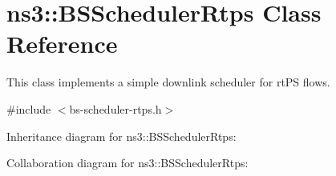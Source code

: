 \hypertarget{classns3_1_1BSSchedulerRtps}{}\section{ns3\+:\+:B\+S\+Scheduler\+Rtps Class Reference}
\label{classns3_1_1BSSchedulerRtps}


This class implements a simple downlink scheduler for rt\+PS flows.  




{\ttfamily \#include $<$bs-\/scheduler-\/rtps.\+h$>$}



Inheritance diagram for ns3\+:\+:B\+S\+Scheduler\+Rtps\+:


Collaboration diagram for ns3\+:\+:B\+S\+Scheduler\+Rtps\+:
